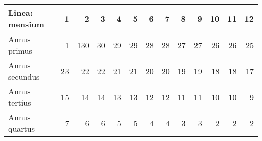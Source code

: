 %
%
\begin{tabular}{ l *{12}{r} }
Linea: mensium &
1 & 2 & 3 & 4 & 5 & 6 & 7 & 8 & 9 & 10 & 11 & 12
\\
\hline
Annus primus &
1 & 1\textbar{}30 & 30 & 29 & 29 & 28 & 28 & 27 & 27 & 26 & 26 & 25 
\\
Annus secundus &
23 & 22 & 22 &21  &21  & 20 & 20 & 19 & 19 & 18 & 18 & 17
\\
Annus tertius &
15 & 14 & 14 & 13 & 13 & 12 & 12 & 11 & 11 & 10 & 10 & 9
\\
Annus quartus &
7 & 6 & 6 & 5 & 5 & 4 & 4 & 3 & 3 & 2 & 2 & 2
\end{tabular}
%
%

